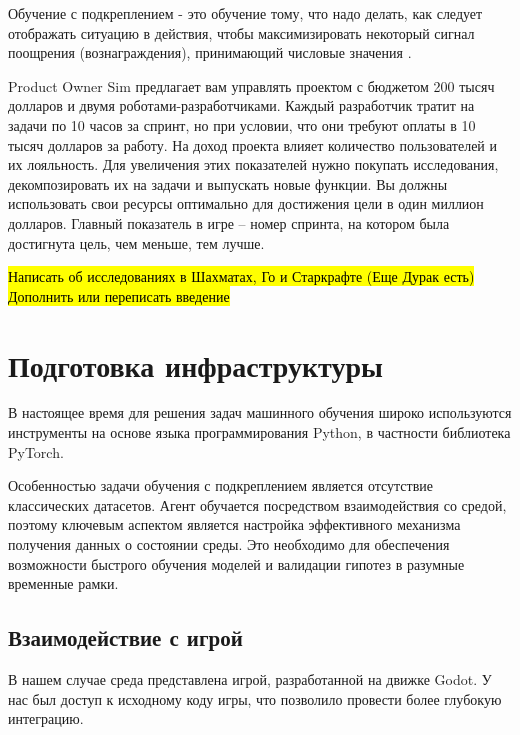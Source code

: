 \documentclass{article}
\begin{document}
Обучение с подкреплением - это обучение тому, что надо делать, как следует отображать ситуацию в действия, чтобы максимизировать некоторый сигнал поощрения (вознаграждения), принимающий числовые значения \cite{Satton-Barto}.

Product Owner Sim \cite{game-link} предлагает вам управлять проектом с бюджетом 200 тысяч долларов и двумя роботами-разработчиками.
Каждый разработчик тратит на задачи по 10 часов за спринт, но при условии, что они требуют оплаты в 10 тысяч долларов за работу.
На доход проекта влияет количество пользователей и их лояльность.
Для увеличения этих показателей нужно покупать исследования, декомпозировать их на задачи и выпускать новые функции.
Вы должны использовать свои ресурсы оптимально для достижения цели в один миллион долларов.
Главный показатель в игре -- номер спринта, на котором была достигнута цель, чем меньше, тем лучше.

\hl{Написать об исследованиях в Шахматах, Го и Старкрафте (Еще Дурак есть)}
\hl{Дополнить или переписать введение}

\newpage

\section*{}

\section{Подготовка инфраструктуры}

В настоящее время для решения задач машинного обучения широко используются инструменты на основе языка программирования Python, в частности библиотека PyTorch.

Особенностью задачи обучения с подкреплением является отсутствие классических датасетов. 
Агент обучается посредством взаимодействия со средой, поэтому ключевым аспектом является настройка эффективного механизма получения данных о состоянии среды. 
Это необходимо для обеспечения возможности быстрого обучения моделей и валидации гипотез в разумные временные рамки.

\subsection{Взаимодействие с игрой}

В нашем случае среда представлена игрой, разработанной на движке Godot. 
У нас был доступ к исходному коду игры, что позволило провести более глубокую интеграцию.
\end{document}
